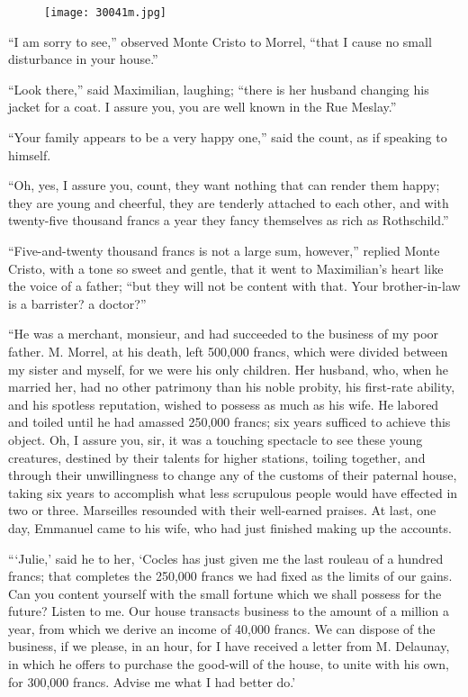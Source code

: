 \begin{figure}[ht]
\texttt{[image: 30041m.jpg]}
\end{figure}

“I am sorry to see,” observed Monte Cristo to Morrel, “that I cause no
small disturbance in your house.”

“Look there,” said Maximilian, laughing; “there is her husband changing
his jacket for a coat. I assure you, you are well known in the Rue
Meslay.”

“Your family appears to be a very happy one,” said the count, as if
speaking to himself.

“Oh, yes, I assure you, count, they want nothing that can render them
happy; they are young and cheerful, they are tenderly attached to each
other, and with twenty-five thousand francs a year they fancy
themselves as rich as Rothschild.”

“Five-and-twenty thousand francs is not a large sum, however,” replied
Monte Cristo, with a tone so sweet and gentle, that it went to
Maximilian’s heart like the voice of a father; “but they will not be
content with that. Your brother-in-law is a barrister? a doctor?”

“He was a merchant, monsieur, and had succeeded to the business of my
poor father. M. Morrel, at his death, left 500,000 francs, which were
divided between my sister and myself, for we were his only children.
Her husband, who, when he married her, had no other patrimony than his
noble probity, his first-rate ability, and his spotless reputation,
wished to possess as much as his wife. He labored and toiled until he
had amassed 250,000 francs; six years sufficed to achieve this object.
Oh, I assure you, sir, it was a touching spectacle to see these young
creatures, destined by their talents for higher stations, toiling
together, and through their unwillingness to change any of the customs
of their paternal house, taking six years to accomplish what less
scrupulous people would have effected in two or three. Marseilles
resounded with their well-earned praises. At last, one day, Emmanuel
came to his wife, who had just finished making up the accounts.

“‘Julie,’ said he to her, ‘Cocles has just given me the last rouleau of
a hundred francs; that completes the 250,000 francs we had fixed as the
limits of our gains. Can you content yourself with the small fortune
which we shall possess for the future? Listen to me. Our house
transacts business to the amount of a million a year, from which we
derive an income of 40,000 francs. We can dispose of the business, if
we please, in an hour, for I have received a letter from M. Delaunay,
in which he offers to purchase the good-will of the house, to unite
with his own, for 300,000 francs. Advise me what I had better do.’

